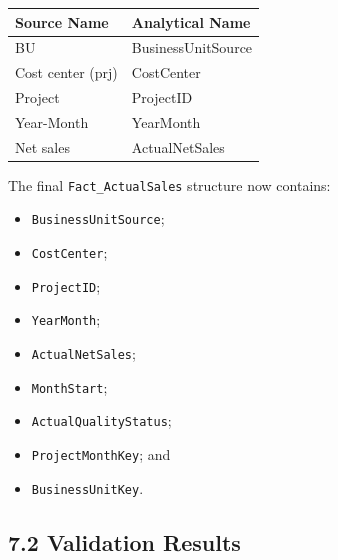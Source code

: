 \documentclass[11pt,a4paper]{article}
\begin{document}
\begin{tabularx}{\textwidth}{
    >{\ttfamily}p{5cm}
    >{\ttfamily}X
}

\toprule

Source Name
&
Analytical Name
\\

\midrule

BU
&
BusinessUnitSource
\\

Cost center (prj)
&
CostCenter
\\

Project
&
ProjectID
\\

Year-Month
&
YearMonth
\\

Net sales
&
ActualNetSales
\\

\bottomrule

\end{tabularx}

The final \texttt{Fact\_ActualSales} structure now contains:

\begin{itemize}[leftmargin=7mm,itemsep=2pt]
    \item \texttt{BusinessUnitSource};
    \item \texttt{CostCenter};
    \item \texttt{ProjectID};
    \item \texttt{YearMonth};
    \item \texttt{ActualNetSales};
    \item \texttt{MonthStart};
    \item \texttt{ActualQualityStatus};
    \item \texttt{ProjectMonthKey}; and
    \item \texttt{BusinessUnitKey}.
\end{itemize}

\subsection{7.2 Validation Results}
\end{document}
